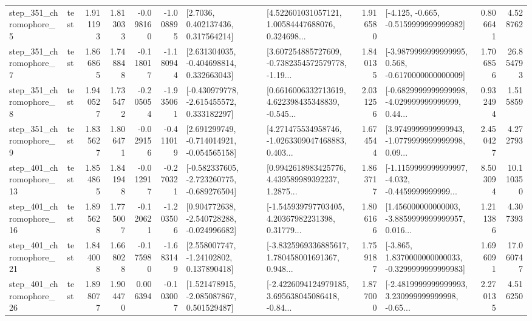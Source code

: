 \begin{tabular}{llrrrrllrlrr}
   step\_351\_chromophore\_5 &      test &      1.911193 &    1.813033 &     -0.098160 & -1.008895 &          [2.7036, 0.402137436, 0.317564214] &  [4.522601031057121, 1.00584447688076, 0.324698... &       1.916580 &              [-4.125, -0.665, -0.5159999999999982] &            0.806641 &          4.528762 \\
   step\_351\_chromophore\_7 &      test &      1.866865 &    1.748848 &     -0.118017 & -1.180944 &    [2.631304035, -0.404698814, 0.332663043] &  [3.607254885727609, -0.7382354572579778, -1.19... &       1.840135 &  [-3.9879999999999995, 0.568, -0.6170000000000009] &            1.706856 &         26.854793 \\
   step\_351\_chromophore\_8 &      test &      1.940527 &    1.735472 &     -0.205054 & -1.935061 &   [-0.430979778, -2.615455572, 0.333182297] &  [0.6616006332713619, 4.622398435348839, -0.545... &       2.031256 &  [-0.6829999999999998, -4.029999999999999, 0.44... &            0.932494 &          1.515859 \\
   step\_351\_chromophore\_9 &      test &      1.835627 &    1.806471 &     -0.029156 & -0.411019 &   [2.691299749, -0.714014921, -0.054565158] &  [4.271475534958746, -1.0263309047468883, 0.403... &       1.674544 &  [3.9749999999999943, -1.0779999999999998, 0.09... &            2.450427 &          4.272793 \\
  step\_401\_chromophore\_13 &      test &      1.854865 &    1.841948 &     -0.012917 & -0.270321 &  [-0.582337605, -2.723260775, -0.689276504] &  [0.9942618983425776, 4.439589989392237, 1.2875... &       1.863717 &  [-1.1159999999999997, -4.032, -0.4459999999999... &            8.503094 &         10.110350 \\
  step\_401\_chromophore\_16 &      test &      1.895628 &    1.775007 &     -0.120621 & -1.203506 &   [0.904772638, -2.540728288, -0.024996682] &  [-1.545939797703405, 4.20367982231398, 0.31779... &       1.806166 &  [1.456000000000003, -3.8859999999999957, 0.016... &            1.211386 &          4.307393 \\
  step\_401\_chromophore\_21 &      test &      1.844008 &    1.668028 &     -0.175980 & -1.683149 &     [2.558007747, -1.24102802, 0.137890418] &  [-3.8325969336885617, 1.780458001691367, 0.948... &       1.759187 &  [-3.865, 1.8370000000000033, -0.3299999999999983] &            1.696091 &         17.060747 \\
  step\_401\_chromophore\_26 &      test &      1.898077 &    1.904470 &      0.006394 & -0.103007 &    [1.521478915, -2.085087867, 0.501529487] &  [-2.4226094124979185, 3.695638045086418, -0.84... &       1.877000 &  [-2.4819999999999993, 3.230999999999998, -0.65... &            2.270135 &          4.516250 \\

\end{tabular}
